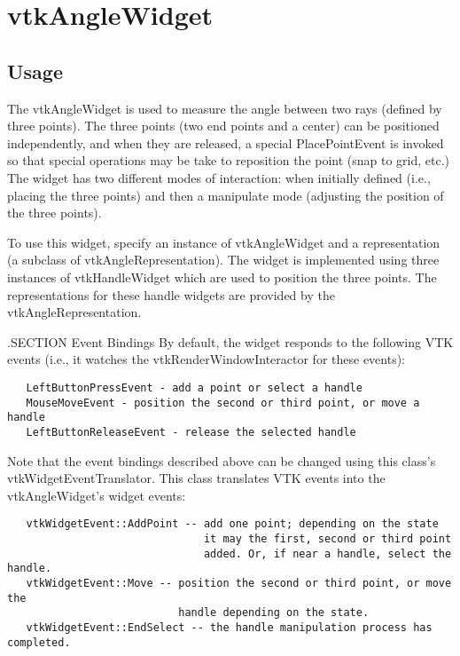 \section{vtkAngleWidget}

\subsection{Usage}

 The vtkAngleWidget is used to measure the angle between two rays (defined
 by three points). The three points (two end points and a center)
 can be positioned independently, and when they are released, a special
 PlacePointEvent is invoked so that special operations may be take to
 reposition the point (snap to grid, etc.) The widget has two different
 modes of interaction: when initially defined (i.e., placing the three
 points) and then a manipulate mode (adjusting the position of the 
 three points).
 
 To use this widget, specify an instance of vtkAngleWidget and a
 representation (a subclass of vtkAngleRepresentation). The widget is
 implemented using three instances of vtkHandleWidget which are used to
 position the three points. The representations for these handle widgets
 are provided by the vtkAngleRepresentation.

 .SECTION Event Bindings
 By default, the widget responds to the following VTK events (i.e., it
 watches the vtkRenderWindowInteractor for these events):
 \begin{verbatim}
   LeftButtonPressEvent - add a point or select a handle 
   MouseMoveEvent - position the second or third point, or move a handle
   LeftButtonReleaseEvent - release the selected handle
 \end{verbatim}

 Note that the event bindings described above can be changed using this
 class's vtkWidgetEventTranslator. This class translates VTK events 
 into the vtkAngleWidget's widget events:
 \begin{verbatim}
   vtkWidgetEvent::AddPoint -- add one point; depending on the state
                               it may the first, second or third point 
                               added. Or, if near a handle, select the handle.
   vtkWidgetEvent::Move -- position the second or third point, or move the
                           handle depending on the state.
   vtkWidgetEvent::EndSelect -- the handle manipulation process has completed.
 \end{verbatim}


